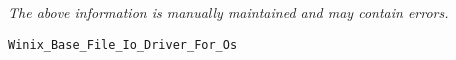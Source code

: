 \label{pkg:winix\_base\_text\_file\_io\_driver\_for\_posix}

{\tiny \it The above information is manually maintained and may contain errors.}
\begin{verbatim}
Winix_Base_File_Io_Driver_For_Os
\end{verbatim}
